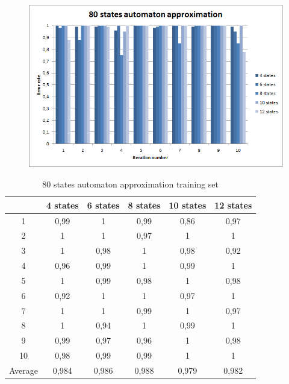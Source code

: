\documentclass[runningheads,a4paper]{llncs}
\begin{document}
\begin{figure}
\centering
\includegraphics[scale=1]{5.png}
\end{figure}


\begin{table}[]
\centering
\caption{80 states automaton approximation training set}
\label{my-label}
\begin{tabular}{@{}cccccc@{}}
\toprule
        & 4 states & 6 states & 8 states & 10 states & 12 states    \\ \midrule
1       & 0,99     & 1        & 0,99     & 0,86      & 0,97 \\
2       & 1        & 1        & 0,97     & 1         & 1 \\
3       & 1        & 0,98     & 1        & 0,98      & 0,92 \\
4       & 0,96     & 0,99     & 1        & 0,99      & 1   \\
5       & 1        & 0,99     & 0,98     & 1         & 0,98   \\
6       & 0,92     & 1        & 1        & 0,97      & 1    \\
7       & 1        & 1        & 0,99     & 1         & 0,97    \\
8       & 1        & 0,94     & 1        & 0,99      & 1    \\
9       & 0,99     & 0,97     & 0,96     & 1         & 0,98 \\
10      & 0,98     & 0,99     & 0,99     & 1         & 1  \\
Average & 0,984    & 0,986    & 0,988    & 0,979     & 0,982  \\ \bottomrule
\end{tabular}
\end{table}
\end{document}
